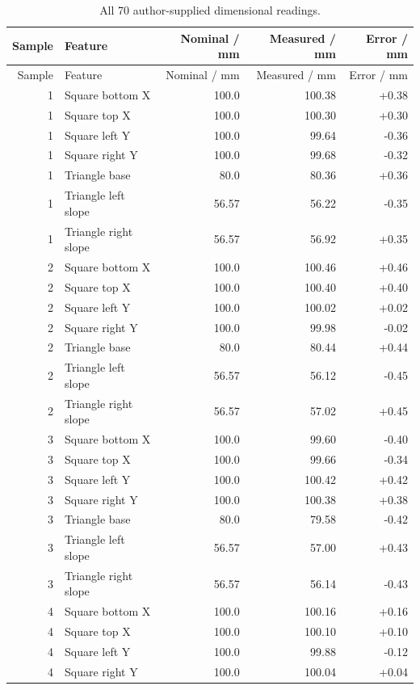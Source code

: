 \begin{longtable}{rlrrr}
\caption{All 70 author-supplied dimensional readings.}\label{tab:app-gantry-all}\\
\toprule Sample & Feature & Nominal / mm & Measured / mm & Error / mm\\\midrule
\endfirsthead
\toprule Sample & Feature & Nominal / mm & Measured / mm & Error / mm\\\midrule\endhead
1 & Square bottom X & 100.0 & 100.38 & +0.38\\
1 & Square top X & 100.0 & 100.30 & +0.30\\
1 & Square left Y & 100.0 & 99.64 & -0.36\\
1 & Square right Y & 100.0 & 99.68 & -0.32\\
1 & Triangle base & 80.0 & 80.36 & +0.36\\
1 & Triangle left slope & 56.57 & 56.22 & -0.35\\
1 & Triangle right slope & 56.57 & 56.92 & +0.35\\
2 & Square bottom X & 100.0 & 100.46 & +0.46\\
2 & Square top X & 100.0 & 100.40 & +0.40\\
2 & Square left Y & 100.0 & 100.02 & +0.02\\
2 & Square right Y & 100.0 & 99.98 & -0.02\\
2 & Triangle base & 80.0 & 80.44 & +0.44\\
2 & Triangle left slope & 56.57 & 56.12 & -0.45\\
2 & Triangle right slope & 56.57 & 57.02 & +0.45\\
3 & Square bottom X & 100.0 & 99.60 & -0.40\\
3 & Square top X & 100.0 & 99.66 & -0.34\\
3 & Square left Y & 100.0 & 100.42 & +0.42\\
3 & Square right Y & 100.0 & 100.38 & +0.38\\
3 & Triangle base & 80.0 & 79.58 & -0.42\\
3 & Triangle left slope & 56.57 & 57.00 & +0.43\\
3 & Triangle right slope & 56.57 & 56.14 & -0.43\\
4 & Square bottom X & 100.0 & 100.16 & +0.16\\
4 & Square top X & 100.0 & 100.10 & +0.10\\
4 & Square left Y & 100.0 & 99.88 & -0.12\\
4 & Square right Y & 100.0 & 100.04 & +0.04\\

\end{longtable}

